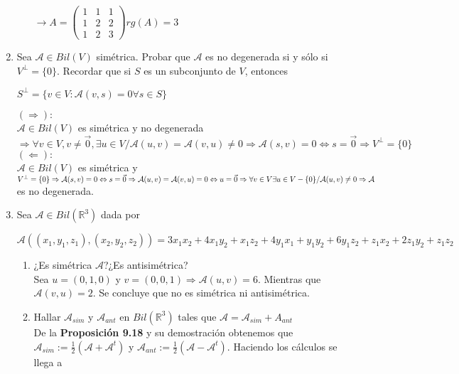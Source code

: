 \documentclass{article}
\newcommand{\R}{\mathbb{R}}
\newcommand{\A}{\mathcal{A}}
\newenvironment{tightcenter}{%
    \setlength\topsep{0pt}
    \setlength\parskip{0pt}
    \begin{center}
}{%
    \end{center}
}
\begin{document}
\begin{enumerate}
\begin{itemize}
\begin{center}
                        $\to A=\begin{pmatrix}
                            1 & 1 & 1 \\
                            1 & 2 & 2 \\
                            1 & 2 & 3 
                        \end{pmatrix}$\quad $rg(A)=3$
                    \end{center}
            \end{itemize}
        \item Sea $\A\in Bil(V)$ simétrica. Probar que $\A$ es no degenerada si y sólo si $V^\perp = \{0\}$. Recordar que si $S$ es un subconjunto de $V$, entonces
            \begin{tightcenter}    
                $S^\perp = \{v\in V:\A(v,s)=0$\quad$\forall s\in S\}$
            \end{tightcenter}
            $(\Rightarrow):$\\
            $\A\in Bil(V)$ es simétrica y no degenerada $\Rightarrow \forall v\in V, v\neq \vec{0},\exists u\in V/\A(u,v)=\A(v,u)\neq 0\Rightarrow \A(s,v)=0 \Leftrightarrow s=\vec{0}\Rightarrow V^\perp =\{0\}$\\
            $(\Leftarrow):$\\
            $\A\in Bil(V)$ es simétrica y $V^\perp =\{0\}\Rightarrow\A(s,v)=0 \Leftrightarrow s=\vec{0}\Rightarrow \A(u,v)=\A(v,u)=0\Leftrightarrow u=\vec{0}\\\Rightarrow \forall v\in V \exists u\in V-\{0\}/\A(u,v)\neq 0\Rightarrow \A$ es no degenerada.
        \item Sea $\A\in Bil(\R^3)$ dada por
            \begin{center}
                $\A((x_1,y_1,z_1),(x_2,y_2,z_2))=3x_1x_2+4x_1y_2+x_1z_2+4y_1x_1+y_1y_2+6y_1z_2+z_1x_2+2z_1y_2+z_1z_2$
            \end{center}
            \begin{enumerate}
                \item ¿Es simétrica $\A$?¿Es antisimétrica?\\
                    Sea $u=(0,1,0)$ y $v=(0,0,1)\Rightarrow \A(u,v)=6$. Mientras que $\A(v,u)=2$. Se concluye que no es simétrica ni antisimétrica.
                \item Hallar $\A_{sim}$ y $\A_{ant}$ en $Bil(\R^3)$ tales que $\A=\A_{sim}+A_{ant}$\\
                    De la \textbf{Proposición 9.18} y su demostración obtenemos que $\A_{sim}:=\frac{1}{2}(\A+\A^t)$ y $\A_{ant}:=\frac{1}{2}(\A-\A^t)$. Haciendo los cálculos se llega a

\end{enumerate}
\end{enumerate}
\end{document}

